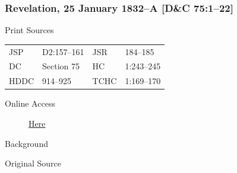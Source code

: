 		\subsubsection{Revelation, 25 January 1832--A [D\&C 75:1--22]}
			\label{EMS-1832-JS-25-JAN-1832-A}
		
			\begin{description}
				\item[Print Sources]
			\end{description}

				\begin{tabular}{p{0.5in}p{1in}p{0.5in}p{1in}}
				JSP	 	& D2:157--161	& JSR 		& 184--185 \\
				DC	 	& Section 75 	& HC 		& 1:243--245 \\
				HDDC 	& 914--925		& TCHC 		& 1:169--170 \\
				\end{tabular}
			
			\begin{description}
				\item[Online Access] \href{https://www.josephsmithpapers.org/paper-summary/revelation-25-january-1832-a-dc-751-22/1}{Here}
			\end{description}
			
			\begin{description}
				\item[Background]
			\end{description}
			
			
			\begin{description}
				\item[Original Source]
			\end{description}
			
			

